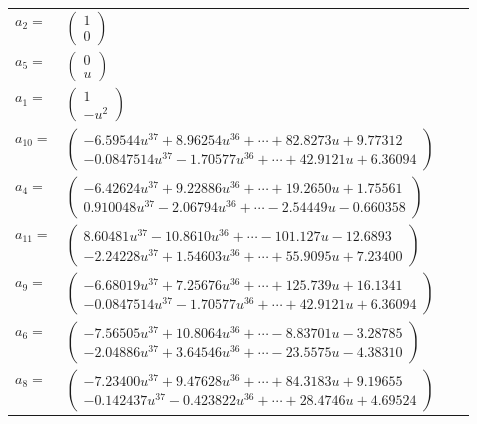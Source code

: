 \documentclass[1p]{elsarticle_modified}
\theoremstyle{definition}
\begin{document}
\begin{tabular}{m{7pt} m{180pt} m{7pt} m{180pt} }
\flushright $a_{2}=$&$\begin{pmatrix}1\\0\end{pmatrix}$ \\
\flushright $a_{5}=$&$\begin{pmatrix}0\\u\end{pmatrix}$ \\
\flushright $a_{1}=$&$\begin{pmatrix}1\\- u^2\end{pmatrix}$ \\
\flushright $a_{10}=$&$\begin{pmatrix}-6.59544 u^{37}+8.96254 u^{36}+\cdots+82.8273 u+9.77312\\-0.0847514 u^{37}-1.70577 u^{36}+\cdots+42.9121 u+6.36094\end{pmatrix}$ \\
\flushright $a_{4}=$&$\begin{pmatrix}-6.42624 u^{37}+9.22886 u^{36}+\cdots+19.2650 u+1.75561\\0.910048 u^{37}-2.06794 u^{36}+\cdots-2.54449 u-0.660358\end{pmatrix}$ \\
\flushright $a_{11}=$&$\begin{pmatrix}8.60481 u^{37}-10.8610 u^{36}+\cdots-101.127 u-12.6893\\-2.24228 u^{37}+1.54603 u^{36}+\cdots+55.9095 u+7.23400\end{pmatrix}$ \\
\flushright $a_{9}=$&$\begin{pmatrix}-6.68019 u^{37}+7.25676 u^{36}+\cdots+125.739 u+16.1341\\-0.0847514 u^{37}-1.70577 u^{36}+\cdots+42.9121 u+6.36094\end{pmatrix}$ \\
\flushright $a_{6}=$&$\begin{pmatrix}-7.56505 u^{37}+10.8064 u^{36}+\cdots-8.83701 u-3.28785\\-2.04886 u^{37}+3.64546 u^{36}+\cdots-23.5575 u-4.38310\end{pmatrix}$ \\
\flushright $a_{8}=$&$\begin{pmatrix}-7.23400 u^{37}+9.47628 u^{36}+\cdots+84.3183 u+9.19655\\-0.142437 u^{37}-0.423822 u^{36}+\cdots+28.4746 u+4.69524\end{pmatrix}$ \\

\end{tabular}
\end{document}
